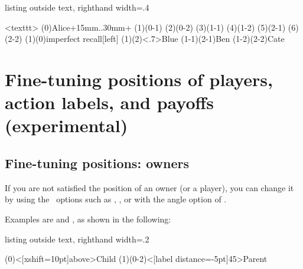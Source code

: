 \label{page:xtCInfoset*}
\begin{tcblisting}{listing outside text, righthand width=.4\linewidth}
\begin{istgame}
<texttt>
\istroot(0){Alice}+15mm..30mm+
  \istb \istb \endist
\istroot(1)(0-1)  \istb \istb \endist
\istroot(2)(0-2)  \istb \istb \endist
\xtdistance{10mm}{10mm}
\istroot(3)(1-1)  \istb \istb \endist
\istroot(4)(1-2)  \istb \istb \endist
\istroot(5)(2-1)  \istb \istb \endist
\istroot(6)(2-2)  \istb \istb \endist
\xtCInfosetO*(1)(0){imperfect recall}[left]
(1)(2)<.7>{Blue}
\xtCInfosetO(1-1)(2-1){Ben}
\xtCInfosetO(1-2)(2-2){Cate}
\end{istgame}
\end{tcblisting}


\section{Fine-tuning positions of players, action labels, and payoffs (experimental)}

\subsection{Fine-tuning positions: owners}

If you are not satisfied the position of an owner (or a player), you can change it by using the \TikZ\ options such as , , or  with the angle option of \cmd{\istroot}.

Examples are  and , as shown in the following: 

\begin{tcblisting}{listing outside text, righthand width=.2\linewidth}
\begin{istgame}
\istroot(0)<[xshift=10pt]above>{Child}
  \istb  
  \istb  
  \endist
\istroot(1)(0-2)<[label distance=-5pt]45>{Parent}
  \istb  
  \istb  
  \endist
\end{istgame}
\end{tcblisting}



